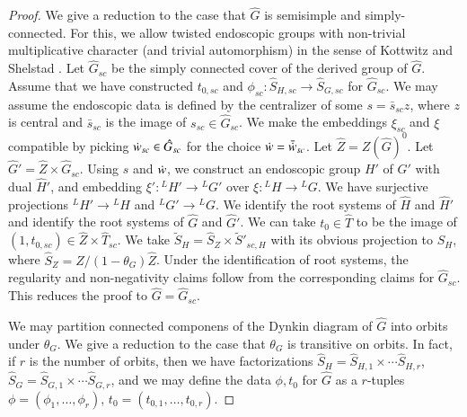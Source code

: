 \begin{proof}
We give a  reduction to the case that $\hat G$ is semisimple and simply-connected.
For this, we allow twisted endoscopic groups with non-trivial multiplicative character (and trivial automorphism) in the sense of Kottwitz and
Shelstad \cite{kottwitz1999foundations}.
Let $\hat G_{sc}$ be the simply connected cover of the derived group of $\hat G$.  
Assume that we have constructed $t_{0,sc}$ and $\phi_{sc}:\hat S_{H,sc}\to \hat S_{G,sc}$ for $\hat G_{sc}$.
We may assume the endoscopic data is defined by the centralizer of some $s = \bar s_{sc} z$,
where $z$ is central and $\bar s_{sc}$ is the image of $s_{sc}\in \hat G_{sc}$.  We make the embeddings $\xi_{sc}$ and $\xi$ compatible by
picking  $\dot w _{sc}\in \hat G_{sc}$ for the choice $\dot w =\bar {\dot w} _{sc}$.
Let $\hat Z = Z(\hat G)^0$.  Let $\hat G' = \hat Z\times \hat G_{sc}$.  Using $s$ and $\dot w$, we construct an endoscopic group $H'$ of $G'$
with dual $\hat H'$, and embedding $\xi':{}^LH' \to {}^LG'$ over $\xi:{}^LH\to {}^LG$.  
We have surjective projections ${}^LH'\to {}^LH$ and
${}^LG'\to {}^LG$.  We identify the root systems of $\hat H$ and $\hat H'$ and identify the root systems of $\hat G$ and $\hat G'$.
We can take $t_0\in \hat T$ to be the image of $(1,t_{0,sc})\in \hat Z\times \hat T_{sc}$.
We take $\tilde S_H = \hat S_Z\times \tilde S'_{sc,H}$ with its obvious projection to $\hat S_H$, where $\hat S_Z = \hat Z/(1-\theta_G)\hat Z$.
Under the identification of root systems, the regularity and non-negativity claims follow from the corresponding claims for $\hat G_{sc}$.
This  reduces the proof to $\hat G  = \hat G_{sc}$.

We may partition connected componens of the Dynkin diagram of $\hat G$ into orbits under $\theta_G$.
We give a reduction to the case that $\theta_G$ is transitive on orbits.
In fact, if $r$ is the number of orbits, then we have factorizations $\hat S_H = \hat S_{H,1} \times\cdots \hat S_{H,r}$, 
$\hat S_G = \hat S_{G,1}\times\cdots \hat S_{G,r}$, and we may define the data $\phi,t_0$ for $\hat G$ as a $r$-tuples
$\phi = (\phi_1,\ldots,\phi_r)$, $t_0 = (t_{0,1},\ldots,t_{0,r})$.


\end{proof}
